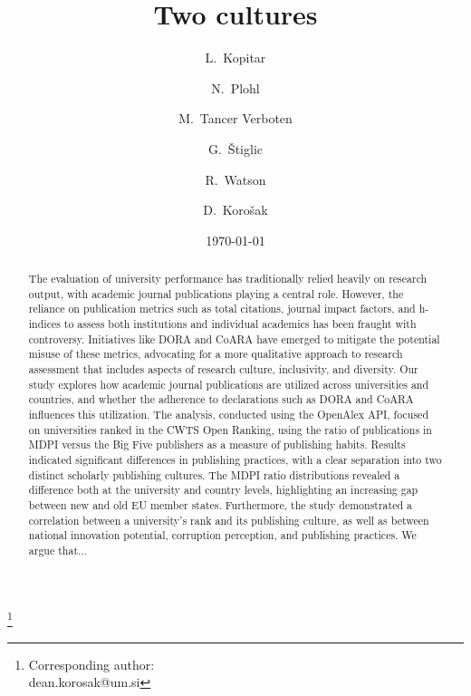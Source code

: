 \documentclass[amsfonts, amssymb, prl, superscriptaddress, notitlepage, twocolumn, nofootinbib]{revtex4-2}
\begin{document}
\title{Two cultures}
\author{L.~Kopitar }

\author{N.~Plohl}

\author{M.~Tancer Verboten}

\author{G.~Štiglic }

\author{R.~Watson }

\author{D.~Korošak  }
\thanks{Corresponding author:\\dean.korosak@um.si}




\date{\today}

\begin{abstract}
The evaluation of university performance has traditionally relied heavily on research output, with academic journal publications playing a central role. However, the reliance on publication metrics such as total citations, journal impact factors, and h-indices to assess both institutions and individual academics has been fraught with controversy. Initiatives like DORA and CoARA have emerged to mitigate the potential misuse of these metrics, advocating for a more qualitative approach to research assessment that includes aspects of research culture, inclusivity, and diversity. Our study explores how academic journal publications are utilized across universities and countries, and whether the adherence to declarations such as DORA and CoARA influences this utilization. The analysis, conducted using the OpenAlex API, focused on universities ranked in the CWTS Open Ranking, using the ratio of publications in MDPI versus the Big Five publishers as a measure of publishing habits. Results indicated significant differences in publishing practices, with a clear separation into two distinct scholarly publishing cultures. The MDPI ratio distributions revealed a difference both at the university and country levels, highlighting an increasing gap between new and old EU member states. Furthermore, the study demonstrated a correlation between a university's rank and its publishing culture, as well as between national innovation potential, corruption perception, and publishing practices. We argue that...
\end{abstract}
\end{document}
